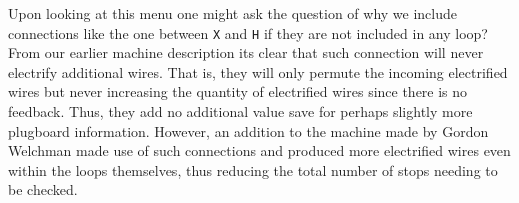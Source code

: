\noindent Upon looking at this menu one might ask the question of why
we include connections like the one between \texttt{X} and \texttt{H}
if they are not included in any loop? From our earlier machine
description its clear that such connection will never electrify
additional wires. That is, they will only permute the incoming
electrified wires but never increasing the quantity of electrified
wires since there is no feedback. Thus, they add no additional value
save for perhaps slightly more plugboard information. However, an
addition to the machine made by Gordon Welchman made use of such
connections and produced more electrified wires even within the loops
themselves, thus reducing the total number of stops needing to be checked.

